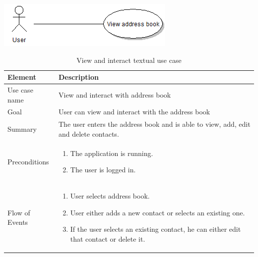 \begin{table}
\begin{center}
\begin{center}
\includegraphics[width=\textwidth]{view_address_book}
\end{center}
\begin{tabular}{p{3cm}|p{12cm}} \hline
\textbf{Element} & \textbf{Description} \\ \hline \hline
Use case name & View and interact with address book \\
Goal & User can view and interact with the address book \\
Summary &The user enters the address book and is able to view, add, edit and delete contacts. \\
Preconditions &
\begin{enumerate}
\item{}The application is running.
\item{}The user is logged in.
\end{enumerate} \\ \hline
Flow of Events &
\begin{enumerate}
\item{}User selects address book.
\item{}User either adds a new contact or selects an existing one.
\item{}If the user selects an existing contact, he can either edit that contact or delete it.
\end{enumerate} \\ \hline
\end{tabular}
\end{center}
\caption{View and interact textual use case} \label{tab:viewandinteract}
\end{table}

